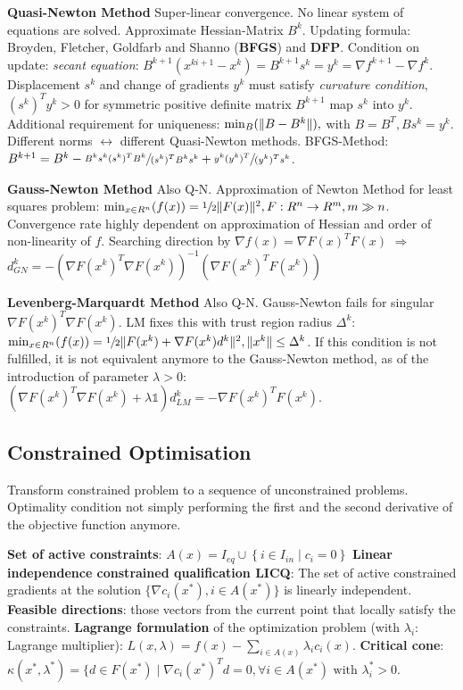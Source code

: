 \textbf{Quasi-Newton Method}
Super-linear convergence. No linear system of equations are solved.
Approximate Hessian-Matrix $B^k$. 
Updating formula: Broyden, Fletcher, Goldfarb and Shanno (\textbf{BFGS}) and \textbf{DFP}.
Condition on update: \textit{secant equation}: $B^{k+1} (x^{ki+1}-x^{k}) =B^{k+1} s^{k}=y^{k}= \nabla f^{k+1}-\nabla f^{k}$. 
Displacement $s^k$ and change of gradients $y^k$ must satisfy \textit{curvature condition}, $(s^k)^Ty^k>0$ for symmetric positive definite matrix $B^{k+1}$ map $s^k$ into $y^k$.
Additional requirement for uniqueness: $\min_B(\lVert B-B^k \rVert),$ with $B = B^T, Bs^k=y^k$. 
Different norms $\leftrightarrow$ different Quasi-Newton methods.
BFGS-Method: $B^{k+1} = B^{k} - \sfrac{B^k s^k (s^k)^T B^k}{(s^k)^T B^k s^k} + \sfrac{y^k (y^k)^T}{(y^k)^T s^k}$. %

\textbf{Gauss-Newton Method}
Also Q-N. 
Approximation of Newton Method for least squares problem: $\min_{x \in R^n}(f(x))= \sfrac{1}{2} \lVert F(x) \rVert^2, F: R^n \rightarrow R^m, m \gg n$. 
Convergence rate highly dependent on approximation of Hessian and order of non-linearity of $f$. 
Searching direction by $\nabla f (x) = \nabla F(x)^T F(x)$ $\Rightarrow$ $d_{GN}^k = - (\nabla F(x^k)^T \nabla F(x^k))^{-1} (\nabla F(x^k)^T F(x^k))$

\textbf{Levenberg-Marquardt Method}
Also Q-N. 
Gauss-Newton fails for singular $\nabla F(x^k)^T \nabla F(x^k)$. LM fixes this with trust region radius $\Delta^k$: $\min_{x \in R^n}(f(x))= \sfrac{1}{2} \lVert F(x^k) + \nabla F(x^k) d^k \rVert^2, \lVert x^k \rVert \leq \Delta^k$. 
If this condition is not fulfilled, it is not equivalent anymore to the Gauss-Newton method, as of the introduction of parameter $\lambda > 0$: $ (\nabla F(x^k)^T \nabla F(x^k) + \lambda \mathbb{1}) d_{LM}^k = - \nabla F(x^k)^T F(x^k)$.

\subsection*{Constrained Optimisation}
Transform constrained problem to a sequence of unconstrained problems. 
Optimality condition not simply performing the first and the second derivative of the objective function anymore.

\textbf{Set of active constraints}: $A(x) = I_{eq} \cup \left\{ i \in I_{in} \mid c_i = 0 \right\}$ 
\textbf{Linear independence constrained qualification LICQ}: The set of active constrained gradients at the solution $\{ \nabla c_i (x^*), i \in A(x^*) \}$ is linearly independent.
\textbf{Feasible directions}: those vectors from the current point that locally satisfy the constraints.
\textbf{Lagrange formulation} of the optimization problem (with $\lambda_i$: Lagrange multiplier): $L(x,\lambda) = f(x) - \sum_{i\in A(x)}\lambda_i c_i (x)$.
\textbf{Critical cone}: $\kappa(x^*, \lambda^*) = \{d \in F(x^*) \mid \nabla c_i (x^*) ^T d = 0, \forall i \in A(x^*) \text{ with } \lambda_i^* > 0$.

